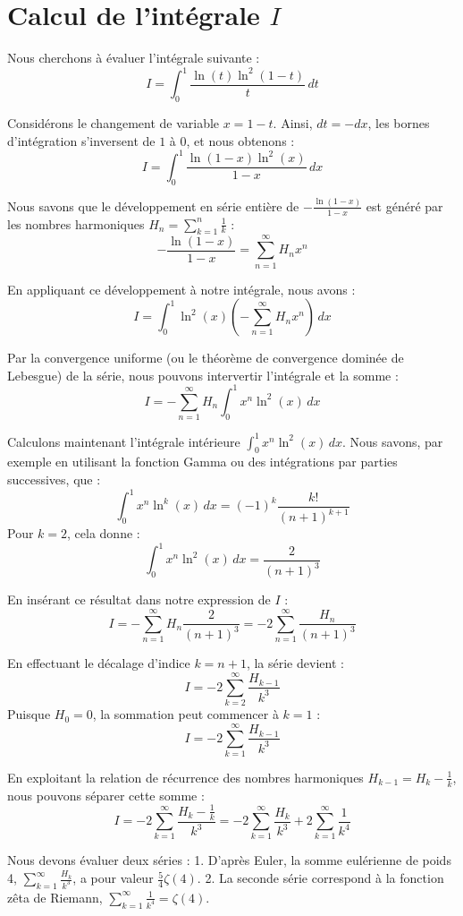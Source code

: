 \documentclass{article}
\begin{document}
\section*{Calcul de l'intégrale $I$}

Nous cherchons à évaluer l'intégrale suivante :
\[
I = \int_0^1 \frac{\ln(t) \ln^2(1-t)}{t} \, dt
\]

Considérons le changement de variable $x = 1 - t$. Ainsi, $dt = -dx$, les bornes d'intégration s'inversent de $1$ à $0$, et nous obtenons :
\[
I = \int_0^1 \frac{\ln(1-x) \ln^2(x)}{1-x} \, dx
\]

Nous savons que le développement en série entière de $-\frac{\ln(1-x)}{1-x}$ est généré par les nombres harmoniques $H_n = \sum_{k=1}^n \frac{1}{k}$ :
\[
- \frac{\ln(1-x)}{1-x} = \sum_{n=1}^\infty H_n x^n
\]

En appliquant ce développement à notre intégrale, nous avons :
\[
I = \int_0^1 \ln^2(x) \left( - \sum_{n=1}^\infty H_n x^n \right) \, dx
\]

Par la convergence uniforme (ou le théorème de convergence dominée de Lebesgue) de la série, nous pouvons intervertir l'intégrale et la somme :
\[
I = - \sum_{n=1}^\infty H_n \int_0^1 x^n \ln^2(x) \, dx
\]

Calculons maintenant l'intégrale intérieure $\int_0^1 x^n \ln^2(x) \, dx$. Nous savons, par exemple en utilisant la fonction Gamma ou des intégrations par parties successives, que :
\[
\int_0^1 x^n \ln^k(x) \, dx = (-1)^k \frac{k!}{(n+1)^{k+1}}
\]
Pour $k=2$, cela donne :
\[
\int_0^1 x^n \ln^2(x) \, dx = \frac{2}{(n+1)^3}
\]

En insérant ce résultat dans notre expression de $I$ :
\[
I = - \sum_{n=1}^\infty H_n \frac{2}{(n+1)^3} = -2 \sum_{n=1}^\infty \frac{H_n}{(n+1)^3}
\]

En effectuant le décalage d'indice $k = n + 1$, la série devient :
\[
I = -2 \sum_{k=2}^\infty \frac{H_{k-1}}{k^3}
\]
Puisque $H_0 = 0$, la sommation peut commencer à $k=1$ :
\[
I = -2 \sum_{k=1}^\infty \frac{H_{k-1}}{k^3}
\]

En exploitant la relation de récurrence des nombres harmoniques $H_{k-1} = H_k - \frac{1}{k}$, nous pouvons séparer cette somme :
\[
I = -2 \sum_{k=1}^\infty \frac{H_k - \frac{1}{k}}{k^3} = -2 \sum_{k=1}^\infty \frac{H_k}{k^3} + 2 \sum_{k=1}^\infty \frac{1}{k^4}
\]

Nous devons évaluer deux séries :
1. D'après Euler, la somme eulérienne de poids 4, $\sum_{k=1}^\infty \frac{H_k}{k^3}$, a pour valeur $\frac{5}{4} \zeta(4)$.
2. La seconde série correspond à la fonction zêta de Riemann, $\sum_{k=1}^\infty \frac{1}{k^4} = \zeta(4)$.
\end{document}
